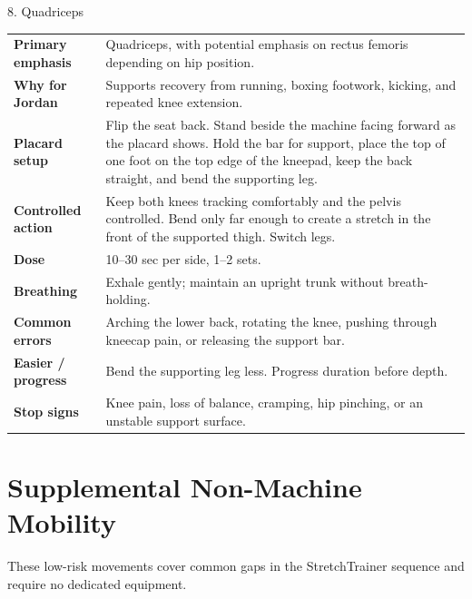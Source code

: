 \documentclass[10pt,letterpaper]{article}
\begin{document}
\begin{stretchbox}{8. Quadriceps}
\begin{tabularx}{\textwidth}{@{}L{1.28in}Y@{}}
\textbf{Primary emphasis} & Quadriceps, with potential emphasis on rectus femoris depending on hip position. \\
\textbf{Why for Jordan} & Supports recovery from running, boxing footwork, kicking, and repeated knee extension. \\
\textbf{Placard setup} & Flip the seat back. Stand beside the machine facing forward as the placard shows. Hold the bar for support, place the top of one foot on the top edge of the kneepad, keep the back straight, and bend the supporting leg. \\
\textbf{Controlled action} & Keep both knees tracking comfortably and the pelvis controlled. Bend only far enough to create a stretch in the front of the supported thigh. Switch legs. \\
\textbf{Dose} & 10--30 sec per side, 1--2 sets. \\
\textbf{Breathing} & Exhale gently; maintain an upright trunk without breath-holding. \\
\textbf{Common errors} & Arching the lower back, rotating the knee, pushing through kneecap pain, or releasing the support bar. \\
\textbf{Easier / progress} & Bend the supporting leg less. Progress duration before depth. \\
\textbf{Stop signs} & Knee pain, loss of balance, cramping, hip pinching, or an unstable support surface. \\
\end{tabularx}
\end{stretchbox}

\Needspace{0.30\textheight}
\section{Supplemental Non-Machine Mobility}

These low-risk movements cover common gaps in the StretchTrainer sequence and require no dedicated equipment.
\end{document}
